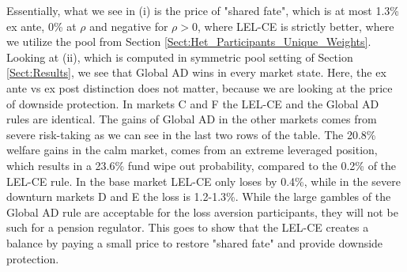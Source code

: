 Essentially, what we see in (i) is the price of "shared fate", which is at most 1.3\% ex ante, 0\% at $\rho$ and negative for $\rho>0$, where LEL-CE is strictly better, where we utilize the pool from Section \ref{Sect:Het_Participants_Unique_Weights}. Looking at (ii), which is computed in symmetric pool setting of Section \ref{Sect:Results}, we see that Global AD wins in every market state. Here, the ex ante vs ex post distinction does not matter, because we are looking at the price of downside protection. In markets C and F the LEL-CE and the Global AD rules are identical. The gains of Global AD in the other markets comes from severe risk-taking as we can see in the last two rows of the table. The 20.8\% welfare gains in the calm market, comes from an extreme leveraged position, which results in a 23.6\% fund wipe out probability, compared to the 0.2\% of the LEL-CE rule. In the base market LEL-CE only loses by 0.4\%, while in the severe downturn markets D and E the loss is 1.2-1.3\%. While the large gambles of the Global AD rule are acceptable for the loss aversion participants, they will not be such for a pension regulator. This goes to show that the LEL-CE creates a balance by paying a small price to restore "shared fate" and provide downside protection.
